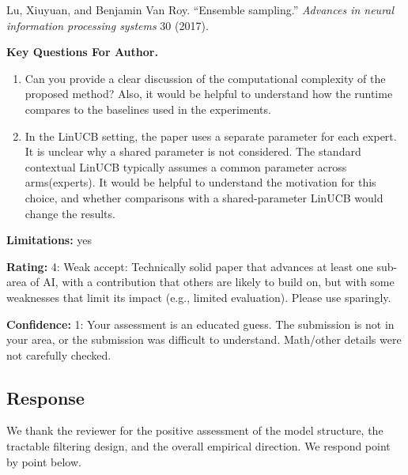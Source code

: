 Lu, Xiuyuan, and Benjamin Van Roy. ``Ensemble sampling.'' \textit{Advances in neural information processing systems} 30 (2017).

\textbf{Key Questions For Author.}
\begin{enumerate}
    \item Can you provide a clear discussion of the computational complexity of the proposed method? Also, it would be helpful to understand how the runtime compares to the baselines used in the experiments.
    \item In the LinUCB setting, the paper uses a separate parameter for each expert. It is unclear why a shared parameter is not considered. The standard contextual LinUCB typically assumes a common parameter across arms(experts). It would be helpful to understand the motivation for this choice, and whether comparisons with a shared-parameter LinUCB would change the results.
\end{enumerate}

\textbf{Limitations:} yes

\textbf{Rating:} 4: Weak accept: Technically solid paper that advances at least one sub-area of AI, with a contribution that others are likely to build on, but with some weaknesses that limit its impact (e.g., limited evaluation). Please use sparingly.

\textbf{Confidence:} 1: Your assessment is an educated guess. The submission is not in your area, or the submission was difficult to understand. Math/other details were not carefully checked.

\subsection{Response}

We thank the reviewer for the positive assessment of the model structure, the tractable filtering design, and the overall empirical direction. We respond point by point below.

